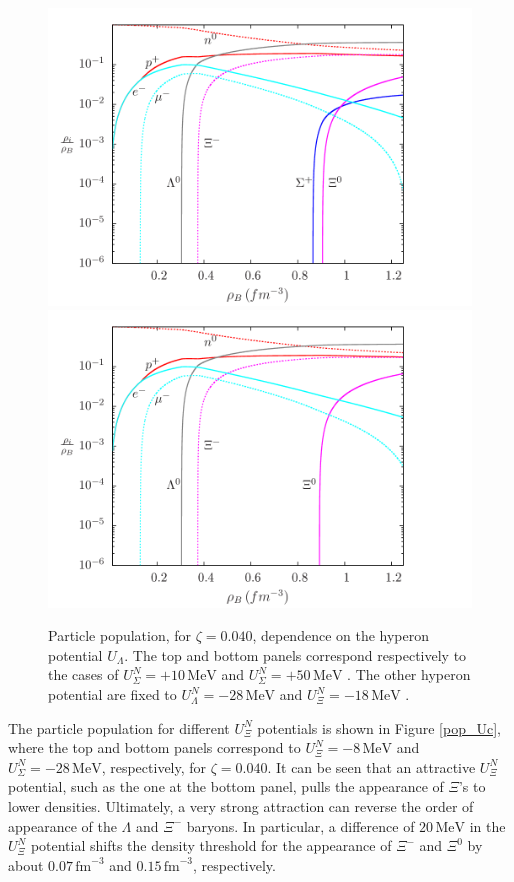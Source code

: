\documentclass[twocolumn,showpacs,aps]{revtex4}
\begin{document}
\begin{figure}
\centering
 \includegraphics[width=9.cm]{pop_paper_l0040_L97a32_Us10.png}
      \centering
   \includegraphics[width=9.cm]{pop_paper_l0040_L97a32_Us50.png}
    \caption{Particle population, for $\zeta=0.040$, dependence on the hyperon potential $U_{\Lambda}$. 
The top and bottom panels correspond respectively to the cases of $U_{\Sigma}^N=+10\, \mathrm{MeV}$
  and $U_{\Sigma}^N=+50\, \mathrm{MeV}$
 .
    The other hyperon potential are fixed to $U_{\Lambda}^N=-28\, \mathrm{MeV}$
  and $U_{\Xi}^N=-18\, \mathrm{MeV}$
 . 
}\label{pop_Us}
 \end{figure}

The particle population for different $U_{\Xi}^N$ potentials is shown in Figure \ref{pop_Uc}, where 
the top and bottom panels correspond to $U_{\Xi}^N=-8\, \mathrm{MeV}$
  and $U_{\Sigma}^N=-28\, \mathrm{MeV}$, respectively, for $\zeta=0.040$.
It can be seen that an attractive $U_{\Xi}^N$ potential, such as the one at the bottom panel,
pulls the appearance of $\Xi$'s to lower densities. 
Ultimately, a very strong attraction can reverse the order of appearance of the $\Lambda$ and $\Xi^-$ baryons.
In particular, a difference of $20 \,\mathrm{MeV}$ in the $U_{\Xi}^N$ potential shifts the density threshold 
for the appearance of $\Xi^-$ and $\Xi^0$ by about $0.07\,\mathrm{fm}^{-3}$
  and $0.15\,\mathrm{fm}^{-3}$, respectively. 
\end{document}
